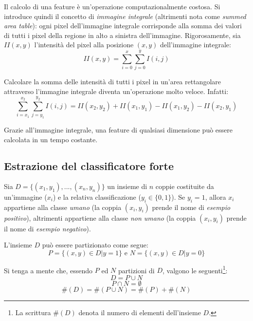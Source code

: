 \documentclass[a4paper,11pt,oneside]{article}
\begin{document}
				Il calcolo di una feature è un'operazione computazionalmente costosa. Si introduce quindi il concetto di \emph{immagine integrale} (altrimenti nota come \emph{summed area table}): ogni pixel dell'immagine integrale corrisponde alla somma dei valori di tutti i pixel della regione in alto a sinistra dell'immagine.
				Rigorosamente, sia $II(x,y)$ l'intensità del pixel alla posizione $(x,y)$ dell'immagine integrale: $$ II(x, y) = \sum_{i = 0}^{x} \sum_{j = 0}^{y} I(i, j) $$

				Calcolare la somma delle intensità di tutti i pixel in un'area rettangolare attraverso l'immagine integrale diventa un'operazione molto veloce.
				Infatti: $$ \sum_{i = x_1}^{x_2} \sum_{j = y_1}^{y_2} I(i,j) =
				II(x_2, y_2) + II(x_1, y_1) - II(x_1, y_2) - II(x_2, y_1)$$

				Grazie all'immagine integrale, una feature di qualsiasi dimensione può essere calcolata in un tempo costante.


		\subsection{Estrazione del classificatore forte} %
		\label{sub:estrazione_del_classificatore_forte}
			Sia $D = \{(x_1, y_1), ..., (x_n, y_n)\}$ un insieme di $n$ coppie costituite da un'immagine ($x_i$) e la relativa classificazione ($y_i \in \{ 0, 1 \}$). Se $y_i = 1$, allora $x_i$ appartiene alla classe \emph{umano} (la coppia $(x_i, y_i)$ prende il nome di \emph{esempio positivo}), altrimenti appartiene alla classe \emph{non umano} (la coppia $(x_i, y_i)$ prende il nome di \emph{esempio negativo}).

			L'insieme $D$ può essere partizionato come segue:
			$$P = \{(x, y) \in D | y = 1\} \text{ e } N = \{(x,y) \in D | y = 0\}$$

			Si tenga a mente che, essendo $P$ ed $N$ partizioni di $D$, valgono le seguenti\footnote{La scrittura $\#(D)$ denota il numero di elementi dell'insieme $D$.}:
			\begin{equation}
				D = P \cup N
			\end{equation}
			\begin{equation}
				P \cap N = \emptyset
			\end{equation}
			\begin{equation}
				\#(D) = \#(P \cup N) = \#(P) + \#(N)
			\end{equation}
\end{document}
